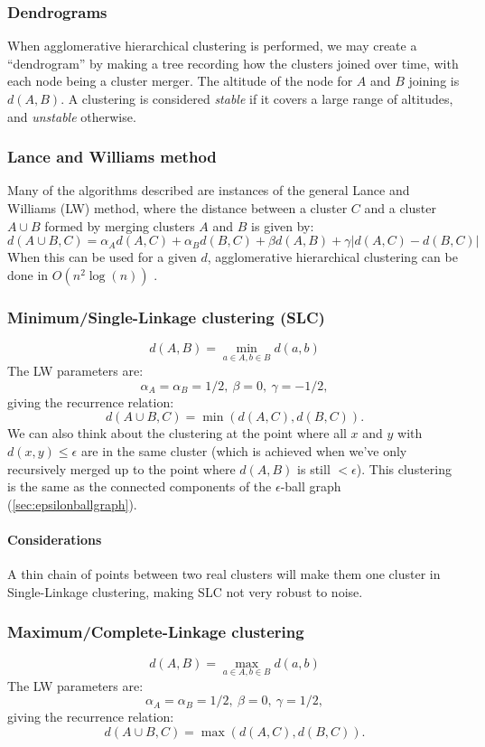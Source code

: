 \documentclass[12pt,a4paper]{article}
\newcommand{\1}[1]{\mathds{1}\left[#1\right]}
\begin{document}
\subsubsection{Dendrograms}
When agglomerative hierarchical clustering is performed, we may create a ``dendrogram'' by making a tree recording how the clusters joined over time, with each node being a cluster merger. The altitude of the node for $A$ and $B$ joining is $d(A,B)$. A clustering is considered \textit{stable} if it covers a large range of altitudes, and \textit{unstable} otherwise.

\subsubsection{Lance and Williams method}
Many of the algorithms described are instances of the general Lance and Williams (LW) method, where the distance between a cluster $C$ and a cluster $A\cup B$ formed by merging clusters $A$ and $B$ is given by:
\[d(A\cup B, C)= \alpha_A d(A,C)+\alpha_B d(B,C) + \beta d(A,B)+\gamma|d(A,C)-d(B,C)|\]
When this can be used for a given $d$, agglomerative hierarchical clustering can be done in $O(n^2\log(n))$ \cite{clusteranalysis}.
\subsubsection{Minimum/Single-Linkage clustering (SLC)}
\[d(A,B)=\min_{a\in A,b\in B}d(a,b)\]
The LW parameters are:
\[\alpha_A=\alpha_B=1/2,\ \beta=0,\ \gamma=-1/2,\] giving the recurrence relation:
\[d(A\cup B,C)=\min (d(A,C),d(B,C)).\]
We can also think about the clustering at the point where all $x$ and $y$ with $d(x,y)\leq \epsilon$ are in the same cluster (which is achieved when we've only recursively merged up to the point where $d(A,B)$ is still $<\epsilon$). This clustering is the same as the connected components of the $\epsilon$-ball graph (\ref{sec:epsilonballgraph}).

\paragraph{Considerations} A thin chain of points between two real clusters will make them one cluster in Single-Linkage clustering, making SLC not very robust to noise.
\subsubsection{Maximum/Complete-Linkage clustering}
\[d(A,B)=\max_{a\in A,b\in B}d(a,b)\]
The LW parameters are:
\[\alpha_A=\alpha_B=1/2,\ \beta=0,\ \gamma=1/2,\] giving the recurrence relation:
\[d(A\cup B,C)=\max (d(A,C),d(B,C)).\]
\end{document}
